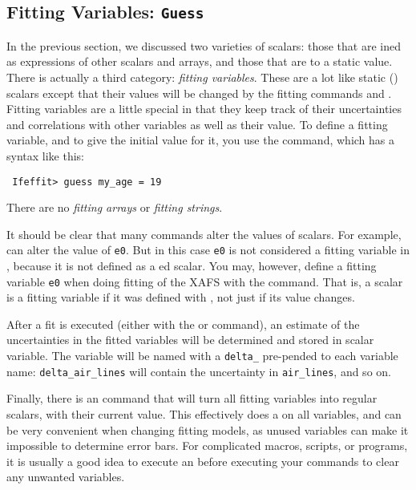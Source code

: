 \subsection{Fitting Variables: {\texttt{Guess}}}
\label{Ch:Structure-Guess}

In the previous section, we discussed two varieties of scalars: those that
are {}ined as expressions of other scalars and arrays, and those
that are {} to a static value.  There is actually a third category:
{\emph{fitting variables}}.  These are a lot like static ({})
scalars except that their values will be changed by the fitting commands
{} and {}.  Fitting variables are a little special
in that they keep track of their uncertainties and correlations with other
variables as well as their value.  To define a fitting variable, and to
give the initial value for it, you use the {} command, which has
a syntax like this: 
\begin{verbatim}
 Ifeffit> guess my_age = 19
\end{verbatim}
\noindent
There are no {\emph{fitting arrays}} or {\emph{fitting strings}}.

It should be clear that many commands alter the values of scalars.  For
example, {} can alter the value of {\tt{e0}}.  But in this
case {\tt{e0}} is not considered a fitting variable in {},
because it is not defined as a {}ed scalar.  You may, however,
define a fitting variable {\tt{e0}} when doing fitting of the XAFS with the
{} command.  That is, a scalar is a fitting variable if it was
defined with {}, not just if its value changes.

After a fit is executed (either with the {} or
{} command), an estimate of the uncertainties in the fitted
variables will be determined and stored in scalar variable.  The variable
will be named with a {\tt{delta\_}} pre-pended to each variable name:
{\tt{delta\_air\_lines}} will contain the uncertainty in {\tt{air\_lines}},
and so on.

Finally, there is an {} command that will turn all fitting
variables into regular scalars, with their current value.  This effectively
does a {} on all variables, and can be very convenient when
changing fitting models, as unused variables can make it impossible to
determine error bars. For complicated macros, scripts, or programs, it is
usually a good idea to execute an {} before executing your
{} commands to clear any unwanted variables.


